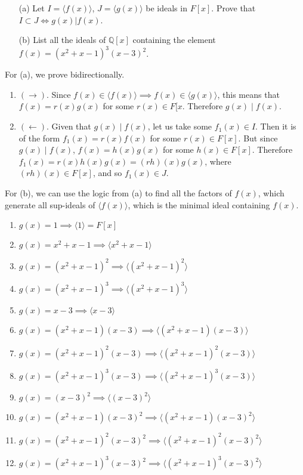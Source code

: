   \begin{exercise}[Shifrin 4.1.5]
    \begin{enumerate}
      \item[(a)] Let $I = \langle f(x) \rangle$, $J = \langle g(x) \rangle$ be ideals in $F[x]$. Prove that $I \subset J \Leftrightarrow g(x)|f(x)$.
      \item[(b)] List all the ideals of $\mathbb{Q}[x]$ containing the element 
      $f(x) = (x^2 + x - 1)^3(x - 3)^2$.
    \end{enumerate}
  \end{exercise}
  \begin{solution}
    For (a), we prove bidirectionally. 
    \begin{enumerate}
      \item $(\rightarrow)$. Since $f (x) \in \langle f(x) \rangle \implies f(x) \in \langle g(x) \rangle$, this means that $f(x) = r(x) g(x)$ for some $r(x) \in F[x$. Therefore $g(x) \mid f(x)$. 

      \item $(\leftarrow)$. Given that $g(x) \mid f(x)$, let us take some $f_1 (x) \in I$. Then it is of the form $f_1(x) = r(x) f(x)$ for some $r(x) \in F[x]$. But since $g(x) \mid f(x)$, $f(x) = h(x) g(x)$ for some $h(x) \in F[x]$. Therefore $f_1 (x) = r(x) h(x) g(x) = (rh)(x) g(x)$, where $(rh)(x) \in F[x]$, and so $f_1 (x) \in J$. 
    \end{enumerate}

    For (b), we can use the logic from (a) to find all the factors of $f(x)$, which generate all sup-ideals of $\langle f(x) \rangle$, which is the minimal ideal containing $f(x)$. 
    \begin{enumerate}
      \item $g(x) = 1 \implies \langle 1 \rangle = F[x]$  
      \item $g(x) = x^2 + x - 1 \implies \langle x^2 + x - 1 \rangle$
      \item $g(x) = (x^2 + x - 1)^2 \implies \langle (x^2 + x - 1)^2 \rangle$
      \item $g(x) = (x^2 + x - 1)^3 \implies \langle (x^2 + x - 1)^3 \rangle$
      \item $g(x) = x - 3 \implies \langle x - 3 \rangle$
      \item $g(x) = (x^2 + x - 1)(x - 3) \implies \langle (x^2 + x - 1)(x - 3) \rangle$
      \item $g(x) = (x^2 + x - 1)^2 (x - 3) \implies \langle (x^2 + x - 1)^2 (x - 3) \rangle$
      \item $g(x) = (x^2 + x - 1)^3 (x - 3) \implies \langle (x^2 + x - 1)^3 (x - 3) \rangle$
      \item $g(x) = (x - 3)^2 \implies \langle (x - 3)^2 \rangle$
      \item $g(x) = (x^2 + x - 1)(x - 3)^2 \implies \langle (x^2 + x - 1)(x - 3)^2 \rangle$
      \item $g(x) = (x^2 + x - 1)^2 (x - 3)^2 \implies \langle (x^2 + x - 1)^2 (x - 3)^2 \rangle$
      \item $g(x) = (x^2 + x - 1)^3 (x - 3)^2 \implies \langle (x^2 + x - 1)^3 (x - 3)^2 \rangle$
    \end{enumerate}
  \end{solution}

